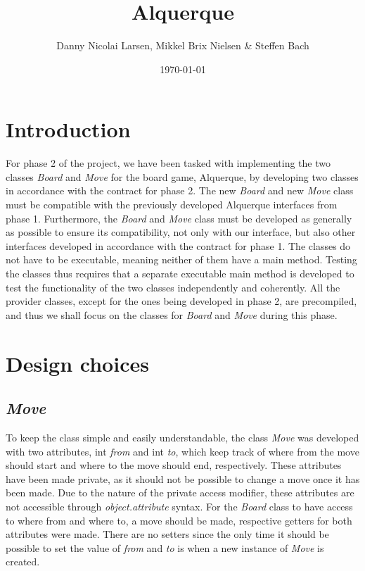 \documentclass[12pt, a4paper]{article}
\title{Alquerque}
\author{Danny Nicolai Larsen, Mikkel Brix Nielsen \& Steffen Bach}
\date{\today}
\begin{document}
\maketitle
\newpage
\tableofcontents
\newpage

\section{Introduction}

For phase 2 of the project, we have been tasked with implementing the two classes \emph{Board} and \emph{Move} for the board game, Alquerque, by developing two classes in accordance with the contract for phase 2. The new \emph{Board} and new \emph{Move} class must be compatible with the previously developed Alquerque interfaces from phase 1. Furthermore, the \emph{Board} and \emph{Move} class must be developed as generally as possible to ensure its compatibility, not only with our interface, but also other interfaces developed in accordance with the contract for phase 1. The classes do not have to be executable, meaning neither of them have a main method. Testing the classes thus requires that a separate executable main method is developed to test the functionality of the two classes independently and coherently. All the provider classes, except for the ones being developed in phase 2, are precompiled, and thus we shall focus on the classes for \emph{Board} and \emph{Move} during this phase.

\section{Design choices}

\subsection{\emph{Move}}
To keep the class simple and easily understandable, the class \emph{Move} was developed with two attributes, int \emph{from} and int \emph{to}, which keep track of where from the move should start and where to the move should end, respectively.
These attributes have been made private, as it should not be possible to change a move once it has been made. Due to the nature of the private access modifier, these attributes are not accessible through \emph{object.attribute} syntax. For the \emph{Board} class to have access to where from and where to, a move should be made, respective getters for both attributes were made. There are no setters since the only time it should be possible to set the value of \emph{from} and \emph{to} is when a new instance of \emph{Move} is created. 
\end{document}
